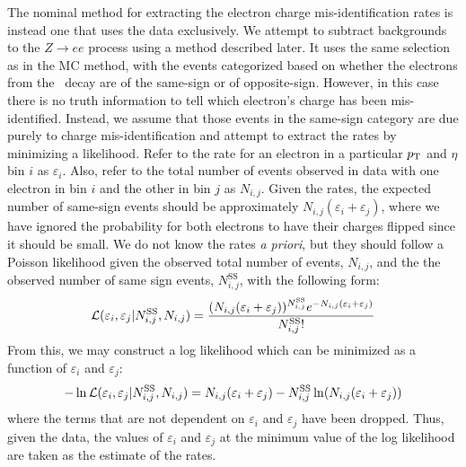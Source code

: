 The nominal method for extracting the electron charge mis-identification
rates is instead one that uses the data exclusively. 
We attempt to subtract backgrounds to the $Z\rightarrow ee$
process using a method described later.
It uses the same selection as in the MC method, with the events
categorized based on whether the electrons from the \z~decay 
are of the same-sign or of opposite-sign.
However, in this case
there is no truth information to tell which electron's charge
has been mis-identified. Instead, we assume that those events in
the same-sign category are due purely to charge mis-identification
and attempt to extract the rates by minimizing a likelihood.
Refer to the rate for an electron in a 
particular $p_{\mathrm{T}}$ and $\eta$ bin $i$ as $\varepsilon_i$.
Also, refer to the total number of events observed in data with one electron
in bin $i$ and the other in bin $j$ as $N_{i,j}$.
Given the rates, the expected number of same-sign events
should be approximately $N_{i,j}(\varepsilon_i + \varepsilon_j)$,
where we have ignored the probability for both electrons to have their
charges flipped since it should be small. We do
not know the rates \emph{a priori}, but they should follow 
a Poisson likelihood given the observed total number of events,
$N_{i,j}$, and the the observed number of same sign events,
$N_{i,j}^{\textrm{SS}}$, with the following form:
\begin{equation}
\mathcal{L}( \varepsilon_i,\varepsilon_j | N_{i,j}^{\textrm{SS}},N_{i,j})
=
\frac{(N_{i,j}(\varepsilon_i+\varepsilon_j))^{N^{\textrm{SS}}_{i,j}} e^{-N_{i,j}(\varepsilon_i+\varepsilon_j)}}{N^{\textrm{SS}}_{i,j}!}
\end{equation}
From this, we may construct a log likelihood which can be minimized
as a function of $\varepsilon_i$ and $\varepsilon_j$:
\begin{equation}
-\ln \mathcal{L}( \varepsilon_i,\varepsilon_j | N_{i,j}^{\textrm{SS}},N_{i,j}) = 
N_{i,j}(\varepsilon_i+\varepsilon_j)
- N^{\textrm{SS}}_{i,j} \ln(N_{i,j}(\varepsilon_i+\varepsilon_j))
\end{equation}
where the terms that are not dependent on $\varepsilon_i$
and $\varepsilon_j$ have been dropped.
Thus, given the data, the values of $\varepsilon_i$ and $\varepsilon_j$
at the minimum value of the log likelihood are taken as the estimate
of the rates.

